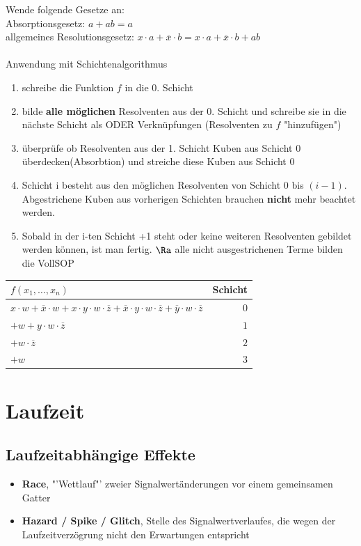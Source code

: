 \documentclass[6pt,a4paper]{scrartcl}
\renewcommand{\emph}[1]{\textsf{\textbf{#1}}}
\begin{document}
\begin{multicols}{3}
	Wende folgende Gesetze an: \\
	Absorptionsgesetz: $a + ab = a$ \\
	allgemeines Resolutionsgesetz: $x \cdot a + \overline x \cdot b = x \cdot a + \overline x \cdot b + ab$ \\
	\\
	Anwendung mit Schichtenalgorithmus
	\begin{enumerate}
		\item schreibe die Funktion $f$ in die 0. Schicht
		\item bilde \textbf{alle möglichen} Resolventen aus der 0. Schicht und schreibe sie in die nächste Schicht als ODER Verknüpfungen (Resolventen zu $f$ "hinzufügen")
		\item überprüfe ob Resolventen aus der 1. Schicht Kuben aus Schicht 0 überdecken(Absorbtion) und streiche diese Kuben aus Schicht 0
		\item Schicht i besteht aus den möglichen Resolventen von Schicht 0 bis $(i-1)$. Abgestrichene Kuben aus vorherigen Schichten brauchen \textbf{nicht} mehr beachtet werden.
		\item Sobald in der i-ten Schicht +1 steht oder keine weiteren Resolventen gebildet werden können, ist man fertig. 
		$\Ra $ alle nicht ausgestrichenen Terme bilden die VollSOP
	\end{enumerate}
	
	\begin{tabular}{l | r}
	$f(x_1, \ldots, x_n)$ & Schicht \\ \midrule
	$x \cdot w + \overline x \cdot w + x \cdot y \cdot w \cdot \overline z + \overline x \cdot y \cdot w \cdot \overline z + \overline y \cdot w \cdot \overline z $& $0$ \\
	$+ w + y \cdot w \cdot \overline z$ & $1$ \\
	$+ w \cdot \overline z $ & $2$ \\
	$+ w$ &$ 3$
	\end{tabular}

\section{Laufzeit}

	\subsection{Laufzeitabhängige Effekte}
	\begin{itemize}
		\item \emph{Race}, "'Wettlauf"' zweier Signalwertänderungen vor einem gemeinsamen Gatter\\
		\item \emph{Hazard / Spike / Glitch}, Stelle des Signalwertverlaufes, die wegen der Laufzeitverzögrung nicht den Erwartungen entspricht\\
	\end{itemize}


\end{multicols}
\end{document}
